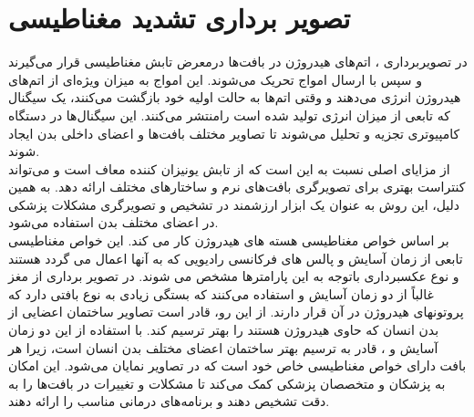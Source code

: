 \section{تصویر برداری تشدید مغناطیسی}
در تصویربرداری ، اتم‌های هیدروژن در بافت‌ها درمعرض تابش مغناطیسی قرار می‌گیرند و سپس با ارسال امواج  تحریک می‌شوند. این امواج  به میزان ویژه‌ای از اتم‌های هیدروژن انرژی می‌دهند و وقتی اتم‌ها به حالت اولیه خود بازگشت می‌کنند، یک سیگنال که تابعی از میزان انرژی تولید شده است رامنتشر می‌کنند. این سیگنال‌ها در دستگاه کامپیوتری تجزیه و تحلیل می‌شوند تا تصاویر مختلف بافت‌ها و اعضای داخلی بدن ایجاد شوند.
\\
از مزایای اصلی  نسبت به  این است که از تابش یونیزان کننده معاف است و می‌تواند کنتراست بهتری برای تصویرگری بافت‌های نرم و ساختارهای مختلف ارائه دهد. به همین دلیل، این روش به عنوان یک ابزار ارزشمند در تشخیص و تصویرگری مشکلات پزشکی در اعضای مختلف بدن استفاده می‌شود.
\\
  بر اساس خواص مغناطیسی هسته های هیدروژن کار می کند. این خواص مغناطیسی تابعی از زمان آسایش و پالس های فرکانسی رادیویی که به آنها اعمال می گردد هستند و نوع عکسبرداری  باتوجه به این پارامترها مشخص می شوند. در تصویر برداری از مغز غالباً از دو زمان آسایش  و  استفاده می‌کنند که بستگی زیادی به نوع بافتی دارد که پروتونهای هیدروژن در آن قرار دارند. از این رو،  قادر است تصاویر ساختمان اعضایی از بدن انسان که حاوی هیدروژن هستند را بهتر ترسیم کند.
با استفاده از این دو زمان آسایش  و ،  قادر به ترسیم بهتر ساختمان اعضای مختلف بدن انسان است، زیرا هر بافت دارای خواص مغناطیسی خاص خود است که در تصاویر نمایان می‌شود. این امکان به پزشکان و متخصصان پزشکی کمک می‌کند تا مشکلات و تغییرات در بافت‌ها را به دقت تشخیص دهند و برنامه‌های درمانی مناسب را ارائه دهند.
\\
